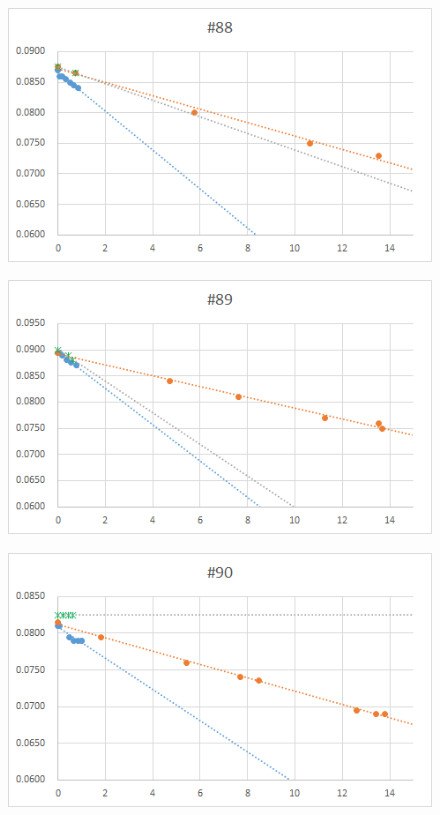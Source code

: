   \begin{figure}[htbp]
    \centering
       \includegraphics[width=120mm]{vol_088.png}
  \end{figure}
  \begin{figure}[htbp]
    \centering
       \includegraphics[width=120mm]{vol_089.png}
  \end{figure}
  \begin{figure}[htbp]
    \centering
       \includegraphics[width=120mm]{vol_090.png}
  \end{figure}
